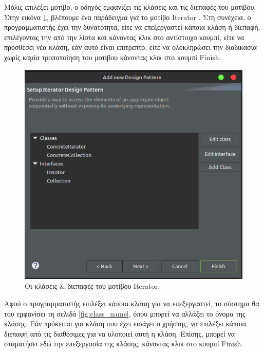 Μόλις επιλέξει μοτίβο, ο οδηγός εμφανίζει τις κλάσεις και τις διεπαφές του μοτίβου. Στην εικόνα \ref{fig:classes_interfaces}, 
βλέπουμε ένα παράδειγμα για το μοτίβο Iterator \cite{GoF}. Στη συνέχεια, ο προγραμματιστής
έχει την δυνατότητα, είτε να επεξεργαστεί κάποια κλάση ή διεπαφή, επιλέγοντας την από την λίστα και κάνοντας κλικ στο αντίστοιχο κουμπί, 
είτε να προσθέσει νέα κλάση, εάν αυτό είναι επιτρεπτό, είτε να ολοκληρώσει την διαδικασία χωρίς καμία τροποποίηση 
του μοτίβου κάνοντας κλικ στο κουμπί Finish.
\begin{figure}[H]
    \centering
    \includegraphics[width=1.0\textwidth]{Figures/classes_interfaces.png}
    \caption{Οι κλάσεις \& διεπαφές του μοτίβου Iterator.}
    \label{fig:classes_interfaces}
\end{figure}
Αφού ο προγραμματιστής επιλέξει κάποια κλάση για να επεξεργαστεί, το σύστημα θα του εμφανίσει τη σελιδά \ref{fig:class_name}, 
όπου μπορεί να αλλάξει το όνομα της κλάσης. Εάν πρόκειται για κλάση που έχει εισάγει ο χρήστης, 
να επιλέξει κάποια διεπαφή από τις διαθέσιμες για να υλοποιεί αυτή η κλάση. Επίσης, μπορεί να σταματήσει εδώ την επεξεργασία της κλάσης, 
κάνοντας κλικ στο κουμπί Finish.
